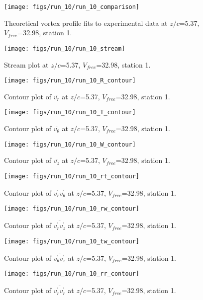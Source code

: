 \begin{figure}[H]
\centering
\texttt{[image: figs/run\_10/run\_10\_comparison]}
\caption{Theoretical vortex profile fits to experimental data at $z/c$=5.37, $V_{free}$=32.98, station 1.}
\end{figure}


\begin{figure}[H]
\centering
\texttt{[image: figs/run\_10/run\_10\_stream]}
\caption{Stream plot at $z/c$=5.37, $V_{free}$=32.98, station 1.}
\end{figure}


\begin{figure}[H]
\centering
\texttt{[image: figs/run\_10/run\_10\_R\_contour]}
\caption{Contour plot of $\overline{v_{r}}$ at $z/c$=5.37, $V_{free}$=32.98, station 1.}
\end{figure}


\begin{figure}[H]
\centering
\texttt{[image: figs/run\_10/run\_10\_T\_contour]}
\caption{Contour plot of $\overline{v_{\theta}}$ at $z/c$=5.37, $V_{free}$=32.98, station 1.}
\end{figure}


\begin{figure}[H]
\centering
\texttt{[image: figs/run\_10/run\_10\_W\_contour]}
\caption{Contour plot of $\overline{v_{z}}$ at $z/c$=5.37, $V_{free}$=32.98, station 1.}
\end{figure}


\begin{figure}[H]
\centering
\texttt{[image: figs/run\_10/run\_10\_rt\_contour]}
\caption{Contour plot of $\overline{v_{r}^{\prime} v_{\theta}^{\prime}}$ at $z/c$=5.37, $V_{free}$=32.98, station 1.}
\end{figure}


\begin{figure}[H]
\centering
\texttt{[image: figs/run\_10/run\_10\_rw\_contour]}
\caption{Contour plot of $\overline{v_{r}^{\prime} v_{z}^{\prime}}$ at $z/c$=5.37, $V_{free}$=32.98, station 1.}
\end{figure}


\begin{figure}[H]
\centering
\texttt{[image: figs/run\_10/run\_10\_tw\_contour]}
\caption{Contour plot of $\overline{v_{\theta}^{\prime} v_{z}^{\prime}}$ at $z/c$=5.37, $V_{free}$=32.98, station 1.}
\end{figure}


\begin{figure}[H]
\centering
\texttt{[image: figs/run\_10/run\_10\_rr\_contour]}
\caption{Contour plot of $\overline{v_{r}^{\prime} v_{r}^{\prime}}$ at $z/c$=5.37, $V_{free}$=32.98, station 1.}
\end{figure}


